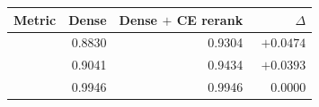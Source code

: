 \begin{tabular}{lrrr}
    \toprule
    Metric & Dense & Dense $+$ CE rerank & $\Delta$ \\
    \midrule
    \mrr{} & 0.8830 & 0.9304 & $\mathbf{+0.0474}$ \\
    \ndcg{} & 0.9041 & 0.9434 & $+0.0393$ \\
    \recallH{} & 0.9946 & 0.9946 & $\phantom{+}0.0000$ \\
    \bottomrule
\end{tabular}
